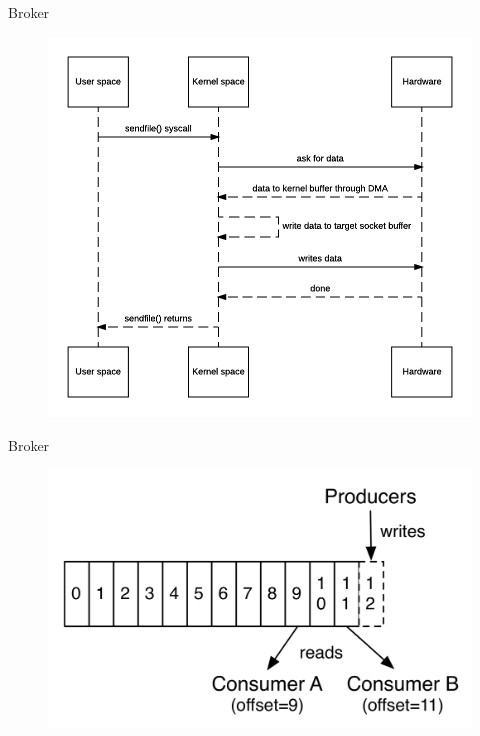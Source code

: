 \begin{frame}[plain,t]{Broker} %
     \\
    \begin{figure}
        \centering
        \includegraphics[width=0.7\linewidth]{image/0202}
        \label{fig:0202}
    \end{figure}
    
\end{frame}
\begin{frame}[plain,t]{Broker} %
     \\
    
    \begin{figure}
        \centering
        \includegraphics[width=0.9\linewidth]{image/0104}
        \label{fig:0104}
    \end{figure}
    
\end{frame}
